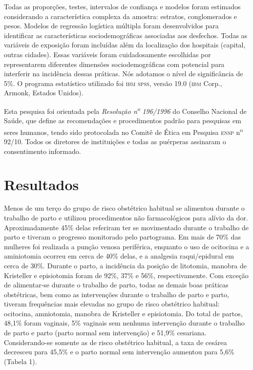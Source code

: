 \documentclass{article}
\begin{document}
Todas as proporções, testes, intervalos de confiança e modelos foram estimados
considerando a característica complexa da amostra: estratos, conglomerados e
pesos. Modelos de regressão logística múltipla foram desenvolvidos para
identificar as características sociodemográficas associadas aos desfechos. Todas
as variáveis de exposição foram incluídas além da localização dos hospitais
(capital, outras cidades). Essas variáveis foram cuidadosamente escolhidas por
representarem diferentes dimensões sociodemográficas com potencial para
interferir na incidência dessas práticas. Nós adotamos o nível de significância
de 5\%. O programa estatístico utilizado foi \textsc{ibm} \textsc{spss}, versão 19.0 (\textsc{ibm} Corp.,
Armonk, Estados Unidos).

Esta pesquisa foi orientada pela \textit{Resolução
n}\textsuperscript{\textit{o}}
\textit{
196/1996}
do Conselho Nacional de Saúde, que define as recomendações
e procedimentos padrão para pesquisas em seres humanos, tendo sido protocolada
no Comitê de Ética em Pesquisa \textsc{ensp} n\textsuperscript{o}
92/10.
Todos os diretores de instituições e todas as puérperas assinaram o
consentimento informado.

\section{Resultados}

Menos de um terço do grupo de risco obstétrico habitual se alimentou durante o
trabalho de parto e utilizou procedimentos não farmacológicos para alívio da
dor.
Aproximadamente 45\% delas referiram ter se movimentado durante o trabalho de
parto e
tiveram o progresso monitorado pelo partograma. Em mais de 70\% das mulheres foi
realizada a punção venosa periférica, enquanto o uso de ocitocina e a
aminiotomia
ocorreu em cerca de 40\% delas, e a analgesia raqui/epidural em cerca de 30\%.
Durante
o parto, a incidência da posição de litotomia, manobra de Kristeller e
episiotomia
foram de 92\%, 37\% e 56\%, respectivamente. Com exceção de alimentar-se durante
o
trabalho de parto, todas as demais boas práticas obstétricas, bem como as
intervenções durante o trabalho de parto e parto, tiveram frequências mais
elevadas
no grupo de risco obstétrico habitual: ocitocina, amniotomia, manobra de
Kristeller
e episiotomia. Do total de partos, 48,1\% foram vaginais, 5\% vaginais sem
nenhuma
intervenção durante o trabalho de parto e parto (parto normal sem intervenção) e
51,9\% cesariana. Considerando-se somente as de risco obstétrico habitual, a
taxa de
cesárea decresceu para 45,5\% e o parto normal sem intervenção aumentou para
5,6\%
(Tabela 1).
\end{document}
